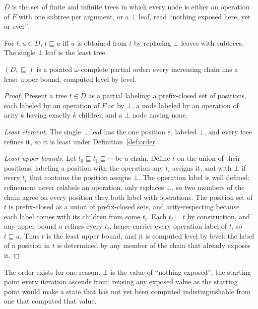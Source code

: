 \begin{definition}[Trees]\label{def:trees}
  $D$ is the set of finite and infinite trees in which every node is either an operation of
  $F$ with one subtree per argument, or a $\bot$ leaf, read ``nothing exposed here, yet or ever''.
\end{definition}

\begin{definition}\label{def:order}
  For $t, u \in D$, $t \sqsubseteq u$ iff $u$ is obtained from $t$ by replacing $\bot$ leaves with subtrees. The single $\bot$ leaf is the least tree.
\end{definition}

\begin{proposition}\label{prop:order}
  $(D, \sqsubseteq)$ is a pointed $\omega$-complete partial order: every increasing chain has a least upper bound, computed level by level.
\end{proposition}
\begin{proof}
  Present a tree $t \in D$ as a partial labeling: a prefix-closed set of positions, each labeled by an operation of $F$ or by $\bot$, a node labeled by an operation of arity $k$ having exactly $k$ children and a $\bot$ node having none.

  \emph{Least element.} The single $\bot$ leaf has the one position $\varepsilon$, labeled $\bot$, and every tree refines it, so it is least under Definition~\ref{def:order}.

  \emph{Least upper bounds.} Let $t_0 \sqsubseteq t_1 \sqsubseteq \cdots$ be a chain. Define $t$ on the union of their positions, labeling a position with the operation any $t_i$ assigns it, and with $\bot$ if every $t_i$ that contains the position assigns $\bot$. The operation label is well defined: refinement never relabels an operation, only replaces $\bot$, so two members of the chain agree on every position they both label with operations. The position set of $t$ is prefix-closed as a union of prefix-closed sets, and arity-respecting because each label comes with its children from some $t_i$. Each $t_i \sqsubseteq t$ by construction, and any upper bound $u$ refines every $t_i$, hence carries every operation label of $t$, so $t \sqsubseteq u$. Thus $t$ is the least upper bound, and it is computed level by level: the label of a position in $t$ is determined by any member of the chain that already exposes it.
\end{proof}

The order exists for one reason. $\bot$ is the value of ``nothing exposed'', the starting point every iteration ascends from; reusing any exposed value as the starting point would make a state that has not yet been computed indistinguishable from one that computed that value.

